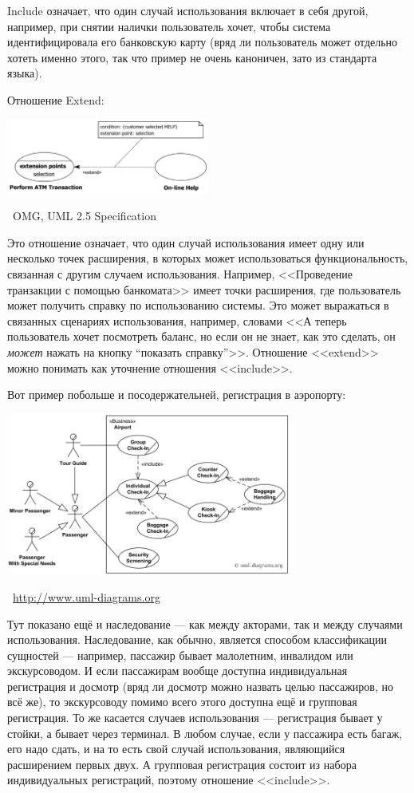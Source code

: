 \documentclass[a5paper]{article}
\newcommand{\attribution}[1] {
    \vspace{-4mm}\begin{flushright}\begin{scriptsize}%
    {\textcopyright\, #1}\end{scriptsize}\end{flushright}
}
\begin{document}
Include означает, что один случай использования включает в себя другой, например, при снятии налички пользователь хочет, чтобы система идентифицировала его банковскую карту (вряд ли пользователь может отдельно хотеть именно этого, так что пример не очень каноничен, зато из стандарта языка).

Отношение Extend:
\begin{center}
    \includegraphics[width=0.5\textwidth]{useCaseExtend.png}
    \attribution{OMG, UML 2.5 Specification}
\end{center}

Это отношение означает, что один случай использования имеет одну или несколько точек расширения, в которых может использоваться функциональность, связанная с другим случаем использования. Например, <<Проведение транзакции с помощью банкомата>> имеет точки расширения, где пользователь может получить справку по использованию системы. Это может выражаться в связанных сценариях использования, например, словами <<А теперь пользователь хочет посмотреть баланс, но если он не знает, как это сделать, он \textit{может} нажать на кнопку ``показать справку''>>. Отношение <<extend>> можно понимать как уточнение отношения <<include>>.

Вот пример побольше и посодержательней, регистрация в аэропорту:

\begin{center}
    \includegraphics[width=0.7\textwidth]{airportUseCase.png}
    \attribution{\url{http://www.uml-diagrams.org}}
\end{center}

Тут показано ещё и наследование --- как между акторами, так и между случаями использования. Наследование, как обычно, является способом классификации сущностей --- например, пассажир бывает малолетним, инвалидом или экскурсоводом. И если пассажирам вообще доступна индивидуальная регистрация и досмотр (вряд ли досмотр можно назвать целью пассажиров, но всё же), то экскурсоводу помимо всего этого доступна ещё и групповая регистрация. То же касается случаев использования --- регистрация бывает у стойки, а бывает через терминал. В любом случае, если у пассажира есть багаж, его надо сдать, и на то есть свой случай использования, являющийся расширением первых двух. А групповая регистрация состоит из набора индивидуальных регистраций, поэтому отношение <<include>>.
\end{document}
